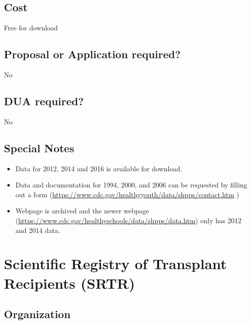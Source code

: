 \documentclass[
]{book}
\providecommand{\tightlist}{%
  \setlength{\itemsep}{0pt}\setlength{\parskip}{0pt}}
\begin{document}
\hypertarget{cost-75}{%
\section{Cost}\label{cost-75}}

Free for download

\hypertarget{proposal-or-application-required-75}{%
\section{Proposal or Application required?}\label{proposal-or-application-required-75}}

No

\hypertarget{dua-required-75}{%
\section{DUA required?}\label{dua-required-75}}

No

\hypertarget{special-notes-75}{%
\section{Special Notes}\label{special-notes-75}}

\begin{itemize}
\tightlist
\item
  Data for 2012, 2014 and 2016 is available for download.
\item
  Data and documentation for 1994, 2000, and 2006 can be requested by filling out a form (\url{https://www.cdc.gov/healthyyouth/data/shpps/contact.htm} )
\item
  Webpage is archived and the newer webpage (\url{https://www.cdc.gov/healthyschools/data/shpps/data.htm}) only has 2012 and 2014 data.
\end{itemize}

\mainmatter

\hypertarget{scientific-registry-of-transplant-recipients-srtr}{%
\chapter{Scientific Registry of Transplant Recipients (SRTR)}\label{scientific-registry-of-transplant-recipients-srtr}}

\hypertarget{organization-76}{%
\section{Organization}\label{organization-76}}
\end{document}
